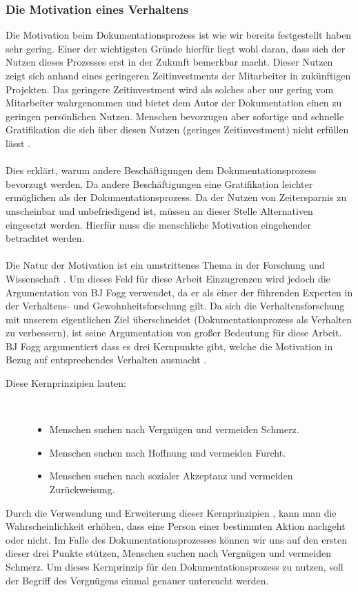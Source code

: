 \documentclass[a4paper,12pt,twoside]{scrartcl}
\begin{document}
\subsubsection{Die Motivation eines Verhaltens}
Die Motivation beim Dokumentationsprozess ist wie wir bereits festgestellt haben sehr gering. Einer der wichtigsten Gründe hierfür liegt wohl daran, dass sich der Nutzen dieses Prozesses erst in der Zukunft bemerkbar macht. Dieser Nutzen zeigt sich anhand eines geringeren Zeitinvestments der Mitarbeiter in zukünftigen Projekten. Das geringere Zeitinvestment wird als solches aber nur gering vom Mitarbeiter wahrgenommen und bietet dem Autor der Dokumentation einen zu geringen persönlichen Nutzen. Menschen bevorzugen aber sofortige und schnelle Gratifikation die sich über diesen Nutzen (geringes Zeitinvestment) nicht erfüllen lässt \cite{Kuhl2009}.
\\\\
Dies erklärt, warum andere Beschäftigungen dem Dokumentationsprozess bevorzugt werden. Da andere Beschäftigungen eine Gratifikation leichter ermöglichen als der Dokumentationsprozess. Da der Nutzen von Zeitersparnis zu unscheinbar und unbefriedigend ist, müssen an dieser Stelle Alternativen eingesetzt werden. Hierfür muss die menschliche Motivation eingehender betrachtet werden.
\\\\
Die Natur der Motivation ist ein umstrittenes Thema in der Forschung und Wissenschaft \cite{Eyal2014}. Um dieses Feld für diese Arbeit Einzugrenzen wird jedoch die Argumentation von BJ Fogg verwendet, da er als einer der führenden Experten in der Verhaltens- und Gewohnheitsforschung gilt. Da sich die Verhaltensforschung mit unserem eigentlichen Ziel überschneidet (Dokumentationprozess als Verhalten zu verbessern), ist seine Argumentation von großer Bedeutung für diese Arbeit. BJ Fogg argumentiert dass es drei Kernpunkte gibt, welche die Motivation in Bezug auf entsprechendes Verhalten ausmacht \cite{Eyal2014}. 
\begin{description}
   \item[Diese Kernprinzipien lauten:]~\par
   \begin{itemize}
      \item Menschen suchen nach Vergnügen und vermeiden Schmerz.
      \item Menschen suchen nach Hoffnung und vermeiden Furcht.
      \item Menschen suchen nach sozialer Akzeptanz und vermeiden Zurückweisung.
   \end{itemize}
\end{description}
Durch die Verwendung und Erweiterung dieser Kernprinzipien \cite{Eyal2014}, kann man die Wahrscheinlichkeit erhöhen, dass eine Person einer bestimmten Aktion nachgeht oder nicht. Im Falle des Dokumentationsprozesses können wir uns auf den ersten dieser drei Punkte stützen, Menschen suchen nach Vergnügen und vermeiden Schmerz. Um dieses Kernprinzip für den Dokumentationsprozess zu nutzen, soll der Begriff des Vergnügens einmal genauer untersucht werden.
\end{document}
